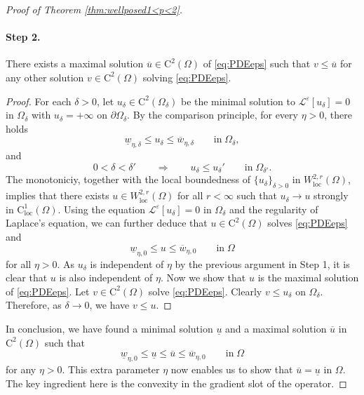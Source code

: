 \documentclass[12pt,reqno]{amsart}
\numberwithin{figure}{section}
\theoremstyle{plain}
\theoremstyle{remark}
\numberwithin{equation}{section}
\newcommand{\rmC}{\mathrm{C}}
\begin{document}
\begin{appendices}
\begin{proof} [Proof of Theorem \ref{thm:wellposed1<p<2}]
\paragraph{\textbf{Step 2.}} There exists a maximal solution $\overline{u}\in \mathrm{C}^2(\Omega)$ of \eqref{eq:PDEeps} such that $v\leq \overline{u}$ for any other solution $v\in \mathrm{C}^2(\Omega)$ solving \eqref{eq:PDEeps}.


\begin{proof} For each $\delta>0$, let $u_\delta\in \mathrm{C}^2(\Omega_\delta)$ be the minimal solution to $\mathcal{L}^\varepsilon[u_\delta] = 0$ in $\Omega_\delta$ with $u_\delta = +\infty$ on $\partial\Omega_\delta$. By the comparison principle, for every $\eta>0$, there holds
\begin{equation*}
    \underline{w}_{\eta,\delta} \leq u_\delta \leq \overline{w}_{\eta,\delta} \qquad\text{in}\;\Omega_\delta,
\end{equation*}
and
\begin{equation*}
    0<\delta<\delta' \qquad \Longrightarrow\qquad u_\delta \leq u_\delta' \qquad\text{in}\;\Omega_{\delta'}.
\end{equation*}
The monotoniciy, together with the local boundedness of $\{u_\delta\}_{\delta>0}$ in $W^{2,r}_{\mathrm{loc}}(\Omega)$, implies that there exists $u\in W^{2,r}_{\mathrm{loc}}(\Omega)$ for all $r<\infty$ such that $u_\delta\to u$ strongly in $\rmC^1_{\mathrm{loc}}(\Omega)$. Using the equation $\mathcal{L}^\varepsilon [u_\delta] = 0$ in $\Omega_\delta$ and the regularity of Laplace's equation, we can further deduce that $u\in \mathrm{C}^2(\Omega)$ solves \eqref{eq:PDEeps} and 
\begin{equation*}
    \underline{w}_{\eta,0} \leq u\leq \overline{w}_{\eta,0} \qquad\text{in}\;\Omega
\end{equation*}
for all $\eta>0$. As $u_\delta$ is independent of $\eta$ by the previous argument in Step 1, it is clear that $u$ is also independent of $\eta$. Now we show that $u$ is the maximal solution of \eqref{eq:PDEeps}. Let $v\in\rmC^2(\Omega)$ solve \eqref{eq:PDEeps}. Clearly $v\leq u_\delta$ on $\Omega_\delta$. Therefore, as $\delta \to 0$, we have $v\leq u$.
\end{proof}
\noindent In conclusion, we have found a minimal solution $\underline{u}$ and a maximal solution $\overline{u}$ in $\rmC^2(\Omega)$ such that
\begin{equation}\label{e:chain}
    \underline{w}_{\eta,0} \leq \underline{u}\leq \overline{u}\leq \overline{w}_{\eta,0} \qquad\text{in}\;\Omega
\end{equation}
for any $\eta>0$. This extra parameter $\eta$ now enables us to show that $\overline{u} = \underline{u}$ in $\Omega$. The key ingredient here is the convexity in the gradient slot of the operator.
\smallskip

\end{proof}
\end{appendices}
\end{document}
